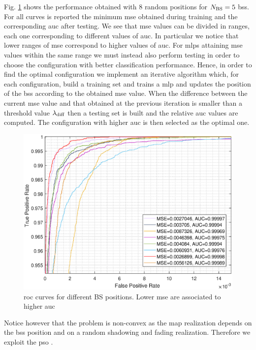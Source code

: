 \documentclass[draftcls,onecolumn,12pt]{IEEEtran}
\begin{document}
Fig. \ref{fig:mseVSauc} shows the performance obtained with $8$ random positions for $N_{\rm BS}=5$ \acp{bs}. For all curves is reported the minimum \ac{mse} obtained during training and the corresponding \ac{auc} after testing. We see that \ac{mse} values can be divided in ranges, each one corresponding to different values of \ac{auc}. In particular we notice that lower ranges of \ac{mse} correspond to higher values of \ac{auc}. For \acp{mlp} attaining  \ac{mse} values within the same range we must instead also perform testing in order to choose the configuration with better classification performance. Hence, in order to find the optimal configuration we implement an iterative algorithm which, for each configuration, build a training set and trains a \ac{mlp} and updates the position of the \acp{bs} according to the obtained \ac{mse} value. When the difference between the current \ac{mse} value and that obtained at the previous iteration is smaller than a threshold value $\lambda_{\rm diff}$ then a testing set is built and the relative \ac{auc} values are computed. The configuration with higher \ac{auc} is then selected as the optimal one.

\begin{figure}
    \centering
    \includegraphics[width=0.5\columnwidth]{mseVSauc.eps}
    \caption{\ac{roc} curves for different BS positions. Lower \ac{mse} are associated to higher \ac{auc}}
    \label{fig:mseVSauc}
\end{figure}

Notice however that the problem is non-convex as the map realization depends on the \acp{bs} position and on a random shadowing and fading realization. Therefore we exploit the \ac{pso} \cite{Kennedy-11}.
\end{document}
